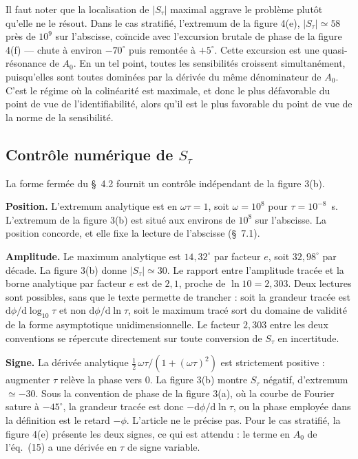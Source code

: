\documentclass[11pt,a4paper]{article}
\begin{document}
Il faut noter que la localisation de $|S_\tau|$ maximal aggrave le problème plutôt qu'elle ne le
résout. Dans le cas stratifié, l'extremum de la figure 4(e), $|S_\tau| \simeq 58$ près de
$10^9$ sur l'abscisse, coïncide avec l'excursion brutale de phase de la figure 4(f) --- chute à
environ $-70^\circ$ puis remontée à $+5^\circ$. Cette excursion est une quasi-résonance de
$A_0$. En un tel point, toutes les sensibilités croissent simultanément, puisqu'elles sont
toutes dominées par la dérivée du même dénominateur de $A_0$. C'est le régime où la colinéarité
est maximale, et donc le plus défavorable du point de vue de l'identifiabilité, alors qu'il est
le plus favorable du point de vue de la norme de la sensibilité.

\subsection{Contrôle numérique de \texorpdfstring{$S_\tau$}{S tau}}

La forme fermée du §~4.2 fournit un contrôle indépendant de la figure 3(b).

\textbf{Position.} L'extremum analytique est en $\omega\tau = 1$, soit $\omega = 10^{8}$ pour
$\tau = 10^{-8}$~s. L'extremum de la figure 3(b) est situé aux environs de $10^{8}$ sur
l'abscisse. La position concorde, et elle fixe la lecture de l'abscisse (§~7.1).

\textbf{Amplitude.} Le maximum analytique est $14{,}32^\circ$ par facteur $e$, soit
$32{,}98^\circ$ par décade. La figure 3(b) donne $|S_\tau| \simeq 30$. Le rapport entre
l'amplitude tracée et la borne analytique par facteur $e$ est de $2{,}1$, proche de
$\ln 10 = 2{,}303$. Deux lectures sont possibles, sans que le texte permette de trancher : soit
la grandeur tracée est $\mathrm{d}\phi/\mathrm{d}\log_{10}\tau$ et non
$\mathrm{d}\phi/\mathrm{d}\ln\tau$, soit le maximum tracé sort du domaine de validité de la
forme asymptotique unidimensionnelle. Le facteur $2{,}303$ entre les deux conventions se
répercute directement sur toute conversion de $S_\tau$ en incertitude.

\textbf{Signe.} La dérivée analytique $\tfrac12\,\omega\tau/(1+(\omega\tau)^2)$ est strictement
positive : augmenter $\tau$ relève la phase vers $0$. La figure 3(b) montre $S_\tau$ négatif,
d'extremum $\simeq -30$. Sous la convention de phase de la figure 3(a), où la courbe de Fourier
sature à $-45^\circ$, la grandeur tracée est donc $-\mathrm{d}\phi/\mathrm{d}\ln\tau$, ou la
phase employée dans la définition est le retard $-\phi$. L'article ne le précise pas. Pour le
cas stratifié, la figure 4(e) présente les deux signes, ce qui est attendu : le terme en $A_0$
de l'éq.~(15) a une dérivée en $\tau$ de signe variable.
\end{document}
